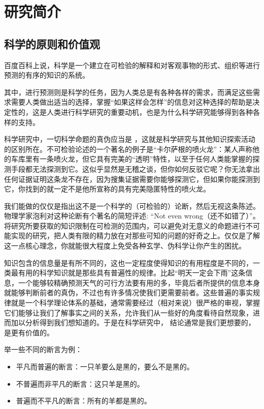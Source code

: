 \documentclass[a4paper,10pt,english]{sphinxmanual}
\begin{document}
\chapter{研究简介}
\label{\detokenize{3. Intro_Research::doc}}\label{\detokenize{3. Intro_Research:id1}}

\section{科学的原则和价值观}
\label{\detokenize{3. Intro_Research:id2}}
百度百科上说，科学是一个建立在可检验的解释和对客观事物的形式、组织等进行预测的有序的知识的系统。

其中，进行预测则是科学的任务，因为人类总是有各种各样的需求，而满足这些需求需要人类做出适当的选择，掌握“如果这样会怎样”的信息对这种选择的帮助是决定性的，这是人类进行科学研究的重要动机，也是为什么科学研究能够得到各种各样的支持。

科学研究中，一切科学命题的真伪应当是  ，这就是科学研究与其他知识探索活动的区别所在。不可检验论述的一个著名的例子是“卡尔萨根的喷火龙”：某人声称他的车库里有一条喷火龙，但它具有完美的“透明”特性，以至于任何人类能掌握的探测手段都无法探测到它。这似乎显然是无稽之谈，但你如何反驳它呢？你无法拿出任何证据证明这条龙不存在，因为搜集证据需要你能够探测它，但如果你能探测到它，你找到的就一定不是他所宣称的具有完美隐匿特性的喷火龙。

我们能做的仅仅是指出这不是一个科学的（可检验的）论断，然后无视这条陈述。物理学家泡利对这种论断有个著名的简短评述: “Not even wrong（还不如错了）”。 将研究所要获取的知识限制在可检测的范围内，可以避免对无意义的命题进行不可能实现的研究，把人类有限的精力放在对那些可知的问题的好奇之上。仅仅是了解这一点核心理念，你就能很大程度上免受各种玄学、伪科学让你产生的困扰。

知识包含的信息量是有所不同的，这也一定程度使得知识的有用程度是不同的，一类最有用的科学知识就是那些具有普遍性的规律。比起“明天一定会下雨”这条信息，一个能够较精确预测天气的可行方法要有用的多，毕竟后者所提供的信息本身就能够判断前者的真伪，不过也有许多情况使我们更需要前者。这些普遍的事实规律就是一个科学理论体系的基础，通常需要经过（相对来说）很严格的审视，掌握它们能够让我们了解事实之间的关系，允许我们从一些好的角度看待自然现象，进而加以分析得到我们想知道的。于是在科学研究中，  结论通常是我们更想要的，是更有价值的。

举一些不同的断言为例：
\begin{itemize}
\item {} 
平凡而普遍的断言：一只羊要么是黑的，要么不是黑的。

\item {} 
不普遍而非平凡的断言：这只羊是黑的。

\item {} 
普遍而不平凡的断言：所有的羊都是黑的。

\end{itemize}
\end{document}
